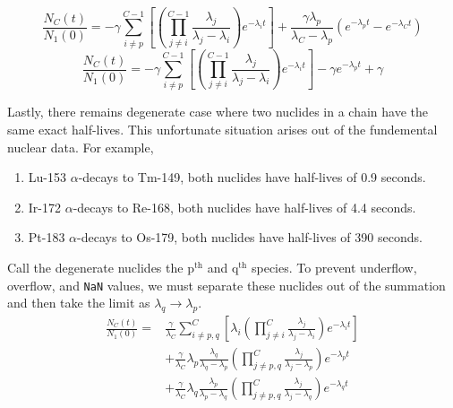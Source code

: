 \documentclass[letterpaper]{physor2018}
\newcommand{\pth}{p$^{\mathrm{th}}$\xspace}
\newcommand{\qth}{q$^{\mathrm{th}}$\xspace}
\begin{document}
\begin{equation}
\label{last-stable-and-almost-stable-3}
   \frac{N_C(t)}{N_1(0)} = -\gamma\sum_{i\ne p}^{C-1} \left[\left(\prod_{j\ne i}^{C-1} \frac{\lambda_j}{\lambda_j - \lambda_i}\right) e^{-\lambda_i t}\right]
                           + \frac{\gamma\lambda_p}{\lambda_C - \lambda_p} \left(e^{-\lambda_p t} - e^{-\lambda_C t}\right)
\end{equation}
\begin{equation}
\label{last-stable-and-almost-stable-4}
   \frac{N_C(t)}{N_1(0)} = -\gamma\sum_{i\ne p}^{C-1} \left[\left(\prod_{j\ne i}^{C-1} \frac{\lambda_j}{\lambda_j - \lambda_i}\right) e^{-\lambda_i t}\right]
                           -\gamma e^{-\lambda_p t} + \gamma
\end{equation}

Lastly, there remains degenerate case where two nuclides in a chain have the same exact half-lives.
This unfortunate situation arises out of the fundemental nuclear data. For example,
\begin{enumerate}
\item Lu-153 $\alpha$-decays to Tm-149, both nuclides have half-lives of 0.9 seconds.
\item Ir-172 $\alpha$-decays to Re-168, both nuclides have half-lives of 4.4 seconds.
\item Pt-183 $\alpha$-decays to Os-179, both nuclides have half-lives of 390 seconds.
\end{enumerate}
Call the degenerate nuclides the \pth and \qth species. To prevent underflow, overflow,
and \texttt{NaN} values, we must separate these nuclides out of the summation
and then take the limit as $\lambda_q \to \lambda_p$.
\begin{equation}
\label{pq-same-0}
\begin{split}
   \frac{N_C(t)}{N_1(0)} = & \frac{\gamma}{\lambda_C}\sum_{i\ne p,q}^{C} \left[\lambda_i \left(\prod_{j\ne i}^{C} \frac{\lambda_j}{\lambda_j - \lambda_i}\right) e^{-\lambda_i t}\right] \\
                           & + \frac{\gamma}{\lambda_C} \lambda_p \frac{\lambda_q}{\lambda_q - \lambda_p} \left(\prod_{j\ne p,q}^{C} \frac{\lambda_j}{\lambda_j - \lambda_p} \right) e^{-\lambda_p t} \\
                           & + \frac{\gamma}{\lambda_C} \lambda_q \frac{\lambda_p}{\lambda_p - \lambda_q} \left(\prod_{j\ne p,q}^{C} \frac{\lambda_j}{\lambda_j - \lambda_q} \right) e^{-\lambda_q t}
\end{split}
\end{equation}
\end{document}
